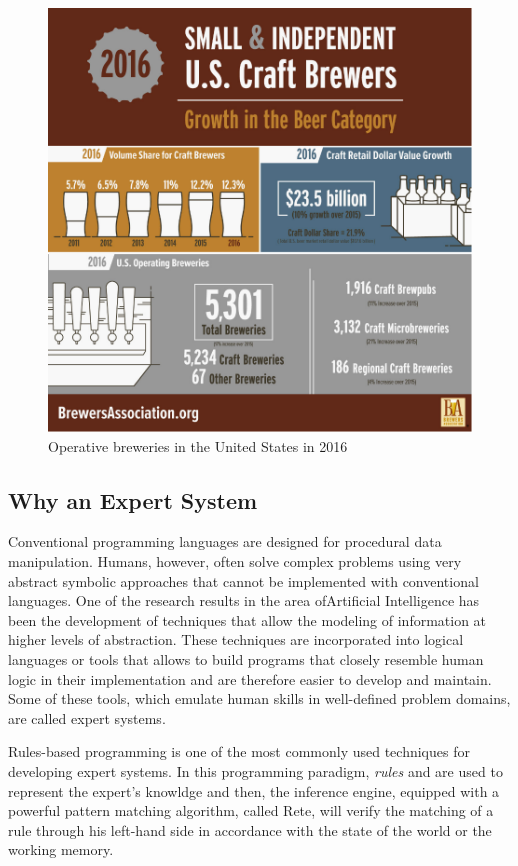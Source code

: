 \documentclass[12pt]{article}
\begin{document}
\begin{figure}[h]
\centering
\includegraphics[scale = 0.4]{img/brewers.png}
\caption{Operative breweries in the United States in 2016}
\end{figure}

\subsection{Why an Expert System}
Conventional programming languages ​​are designed for procedural data manipulation. Humans, however, often solve complex problems using very abstract symbolic approaches that cannot be implemented with conventional languages. One of the research results in the area of ​​Artificial Intelligence has been the development of techniques that allow the modeling of information at higher levels of abstraction. These techniques are incorporated into logical languages ​​or tools that allows to build programs that closely resemble human logic in their implementation and are therefore easier to develop and maintain. Some of these tools, which emulate human skills in well-defined problem domains, are called expert systems. 

Rules-based programming is one of the most commonly used techniques for developing expert systems. In this programming paradigm, \textit{rules} and  are used to represent the expert's knowldge and then, the inference engine, equipped with a powerful pattern matching algorithm, called Rete, will verify the matching of a rule through his left-hand side in accordance with the state of the world or the working memory.
\end{document}
